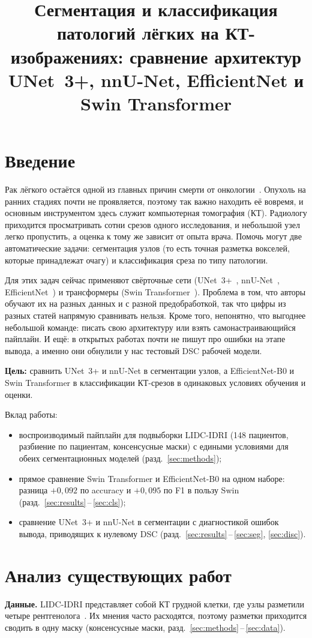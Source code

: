 \documentclass{misisarticle}
\title{Сегментация и классификация патологий лёгких на КТ-изображениях: сравнение архитектур UNet~3+, nnU-Net, EfficientNet и Swin Transformer}
\newcommand{\sref}[2]{\ref{#1}\,--\,\ref{#2}}  %
\begin{document}
\maketitle

\section{Введение}
Рак лёгкого остаётся одной из главных причин смерти от онкологии~\cite{who}. Опухоль на ранних стадиях почти не проявляется, поэтому так важно находить её вовремя, и основным инструментом здесь служит компьютерная томография (КТ). Радиологу приходится просматривать сотни срезов одного исследования, и небольшой узел легко пропустить, а оценка к тому же зависит от опыта врача. Помочь могут две автоматические задачи: сегментация узлов (то есть точная разметка вокселей, которые принадлежат очагу) и классификация среза по типу патологии.

Для этих задач сейчас применяют свёрточные сети (UNet~3+~\cite{huang}, nnU-Net~\cite{isensee}, EfficientNet~\cite{tan}) и трансформеры (Swin Transformer~\cite{liu}). Проблема в том, что авторы обучают их на разных данных и с разной предобработкой, так что цифры из разных статей напрямую сравнивать нельзя. Кроме того, непонятно, что выгоднее небольшой команде: писать свою архитектуру или взять самонастраивающийся пайплайн. И ещё: в открытых работах почти не пишут про ошибки на этапе вывода, а именно они обнулили у нас тестовый DSC рабочей модели.

\textbf{Цель:} сравнить UNet~3+ и nnU-Net в сегментации узлов, а EfficientNet-B0 и Swin Transformer в классификации КТ-срезов в одинаковых условиях обучения и оценки.

Вклад работы:
\begin{itemize}
\item воспроизводимый пайплайн для подвыборки LIDC-IDRI (148 пациентов, разбиение по пациентам, консенсусные маски) с едиными условиями для обеих сегментационных моделей (разд.~\ref{sec:methods});
\item прямое сравнение Swin Transformer и EfficientNet-B0 на одном наборе: разница $+0{,}092$ по accuracy и $+0{,}095$ по F1 в пользу Swin (разд.~\sref{sec:results}{sec:cls});
\item сравнение UNet~3+ и nnU-Net в сегментации с диагностикой ошибок вывода, приводящих к нулевому DSC (разд.~\sref{sec:results}{sec:seg}, \ref{sec:disc}).
\end{itemize}

\section{Анализ существующих работ}
\textbf{Данные.} LIDC-IDRI представляет собой КТ грудной клетки, где узлы разметили четыре рентгенолога~\cite{lidc}. Их мнения часто расходятся, поэтому разметки приходится сводить в одну маску (консенсусные маски, разд.~\sref{sec:methods}{sec:data}).
\end{document}
